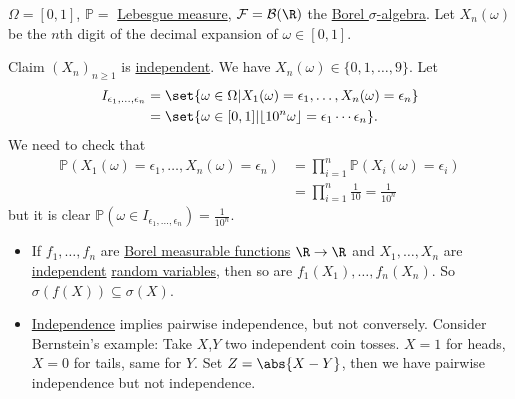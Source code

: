 \documentclass{article}
\newcommand{\1}[1]{\mathbbm{1}_{#1}}
\newcommand{\Prob}{\mathbb{P}}
\DeclarePairedDelimiter\floor{\lfloor}{\rfloor}
\begin{document}
\begin{eg}
    $\Omega = [0, 1]$, $\Prob =$ \hyperlink{def:lebMeas}{Lebesgue measure}, $\mathcal{F} = \mathcal{B}(\R)$ the \hyperlink{def:borelAlg}{Borel $\sigma$-algebra}.
    Let $X_n(\omega)$ be the $n$th digit of the decimal expansion of $\omega \in [0, 1]$.

    Claim $(X_n)_{n \geq 1}$ is \hyperlink{def:indepRV}{independent}. We have $X_n(\omega) \in \{0, 1, \dotsc, 9\}$.
    Let
    \begin{align*}
        I_{\epsilon_1, \dotsc, \epsilon_n} &= \set{\omega \in \Omega | X_1(\omega) = \epsilon_1, \dotsc, X_n(\omega) = \epsilon_n} \\
                                           &= \set{\omega \in [0, 1] | \floor{10^n \omega} = \epsilon_1 \dotsm \epsilon_n}.
    \end{align*}
    We need to check that
    \begin{align*}
        \Prob(X_1(\omega) = \epsilon_1, \dotsc, X_n(\omega) = \epsilon_n) &= \prod_{i=1}^n \Prob(X_i(\omega) = \epsilon_i) \\
                                                                          &= \prod_{i=1}^n \frac{1}{10} = \frac{1}{10^n}
    \end{align*}
    but it is clear $\Prob(\omega \in I_{\epsilon_1, \dotsc, \epsilon_n}) = \frac{1}{10^n}$.
\end{eg}

\begin{remark}\leavevmode
    \begin{itemize}
        \item If $f_1, \dotsc, f_n$ are \hyperlink{def:borelFunc}{Borel measurable functions} $\R \to \R$ and $X_1, \dotsc, X_n$ are \hyperlink{def:indepRV}{independent} \hyperlink{def:rv}{random variables}, then so are $f_1(X_1), \dotsc, f_n(X_n)$.
            So $\sigma(f(X)) \subseteq \sigma(X)$.
        \item \hyperlink{def:indepRV}{Independence} implies pairwise independence, but not conversely.
            Consider Bernstein's example: Take $X$,$Y$ two independent coin tosses.
            $X=1$ for heads, $X=0$ for tails, same for $Y$.
            Set $Z=\abs{X-Y}$, then we have pairwise independence but not independence.
    \end{itemize}
\end{remark}

\end{document}
